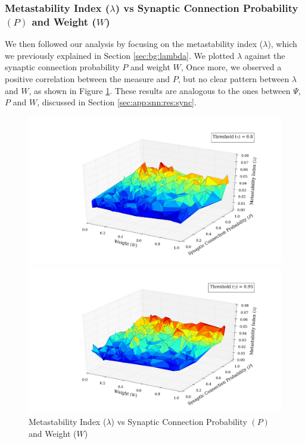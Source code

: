 \documentclass[a4paper,11pt]{article}
\begin{document}
\subsubsection{Metastability Index ($\lambda$) vs Synaptic Connection Probability $(P)$ and Weight ($W$)}
\label{sec:app:snn:res:lambda}
We then followed our analysis by focusing on the metastability index ($\lambda$), which we previously explained in Section \ref{sec:bg:lambda}. We plotted $\lambda$ against the synaptic connection probability $P$ and weight $W$, Once more, we observed a positive correlation between the measure and $P$, but no clear pattern between $\lambda$ and $W$, as shown in Figure \ref{fig:p_w_lambda_all}. These results are analogous to the ones between $\Psi$, $P$ and $W$, discussed in Section \ref{sec:app:snn:res:sync}.

\begin{figure}[H] 
	\begin{minipage}[b]{0.5\linewidth}
		\begin{center}
		\includegraphics[scale = 0.2]{figures/snn/p_w_lambda_8_1}
		\end{center}
		\vspace{4ex}
	\end{minipage}
	\begin{minipage}[b]{0.5\linewidth}
		\begin{center}
		\includegraphics[scale = 0.2]{figures/snn/p_w_lambda_95_1}
		\end{center}
		\vspace{4ex}
	\end{minipage}
	\caption{
			Metastability Index ($\lambda$) vs Synaptic Connection Probability $(P)$ and Weight ($W$)
			\label{fig:p_w_lambda_all}
		}
\end{figure}
\end{document}
